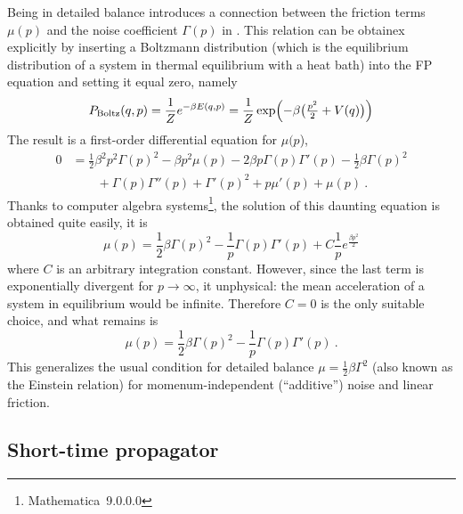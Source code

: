 Being in detailed balance introduces a connection between the friction terms \(\mu(p)\) and the noise coefficient \(\Gamma(p)\) in . This relation can be obtainex explicitly by inserting a Boltzmann distribution (which is the equilibrium distribution of a system in thermal equilibrium with a heat bath) into the FP equation  and setting it equal zero, namely
%
\begin{equation}
	P_\text{Boltz}(q,p)
	= \frac1Ze^{-\beta E(q,p)}
	= \frac1Z\exp\Bigl(-\beta \bigl(\tfrac{p^2}2+V(q)\bigr)\Bigr)
\end{equation}
%
The result is a first-order differential equation for \(\mu(p\)),
%
\begin{equation}\begin{split}
	0
	&=
	\frac12 \beta^2 p^2 \Gamma(p)^2
	- \beta p^2 \mu(p)
	- 2 \beta p \Gamma(p) \Gamma'(p)
	- \frac12 \beta  \Gamma(p)^2
	\\&\qquad
	+\Gamma(p) \Gamma''(p)
	+ \Gamma'(p)^2
	+ p \mu'(p)
	+ \mu(p)  ~.
\end{split}\end{equation}
%
Thanks to computer algebra systems\footnote{Mathematica~9.0.0.0}, the solution of this daunting equation is obtained quite easily, it is
%
\begin{equation}
	\mu(p) = \frac12\beta\Gamma(p)^2 - \frac1p\Gamma(p)\Gamma'(p) + C\frac1pe^{\frac{\beta p^2}2}
\end{equation}
%
where \(C\) is an arbitrary integration constant. However, since the last term is exponentially divergent for \(p\to\infty\), it unphysical: the mean acceleration of a system in equilibrium would be infinite. Therefore \(C = 0\) is the only suitable choice, and what remains is
%
\begin{equation}
	\label{eqn:einstein}
	\mu(p) = \frac12\beta\Gamma(p)^2 - \frac1p\Gamma(p)\Gamma'(p) ~.
\end{equation}
%
This generalizes the usual condition for detailed balance \(\mu = \frac12\beta\Gamma^2\) (also known as the Einstein relation) for momenum-independent (``additive'') noise and linear friction.



\subsection{Short-time propagator}

